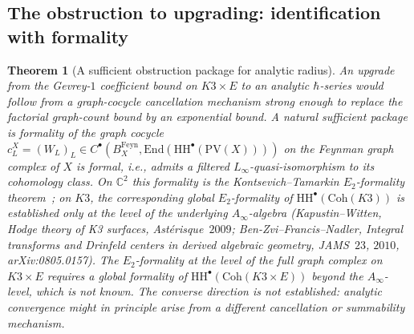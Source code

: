 \documentclass[11pt]{article}
\providecommand{\HH}{\mathrm{HH}}
\providecommand{\C}{\mathbb{C}}
\providecommand{\Coh}{\mathrm{Coh}}
\providecommand{\PV}{\mathrm{PV}}
\newtheorem{theorem}{Theorem}
\theoremstyle{definition}\newtheorem{definition}[theorem]{Definition}
\theoremstyle{remark}\newtheorem{remark}[theorem]{Remark}\newtheorem{example}[theorem]{Example}
\begin{document}
\subsection{The obstruction to upgrading: identification with formality}

\begin{theorem}[A sufficient obstruction package for analytic radius]
\label{thm:obstruction-formality}
An upgrade from the Gevrey-$1$ coefficient bound on $K3\times E$ to an
analytic $\hbar$-series would follow from a graph-cocycle cancellation
mechanism strong enough to replace the factorial graph-count bound by
an exponential bound. A natural sufficient package is formality of the
graph cocycle
$c_L^X = (W_L)_L\in C^\bullet(B^{\mathrm{Feyn}}_{X}, \mathrm{End}(\HH^\bullet(\PV(X))))$
on the Feynman graph complex of $X$ is formal, i.e., admits a
filtered $L_\infty$-quasi-isomorphism to its cohomology class. On
$\C^2$ this formality is the Kontsevich--Tamarkin $E_2$-formality
theorem~\cite{Kontsevich2003}; on $K3$, the corresponding global
$E_2$-formality of $\HH^\bullet(\Coh(K3))$ is established only at
the level of the underlying $A_\infty$-algebra (Kapustin--Witten, Hodge
theory of K3 surfaces, Astérisque~$2009$; Ben-Zvi--Francis--Nadler,
\emph{Integral transforms and Drinfeld centers in derived algebraic
geometry}, JAMS~$23$, $2010$, arXiv:0805.0157).
The $E_2$-formality at the level of the full graph complex on
$K3\times E$ requires a global formality of $\HH^\bullet(\Coh(K3\times E))$
beyond the $A_\infty$-level, which is not known. The converse direction
is not established: analytic convergence might in principle arise from
a different cancellation or summability mechanism.
\end{theorem}
\end{document}
